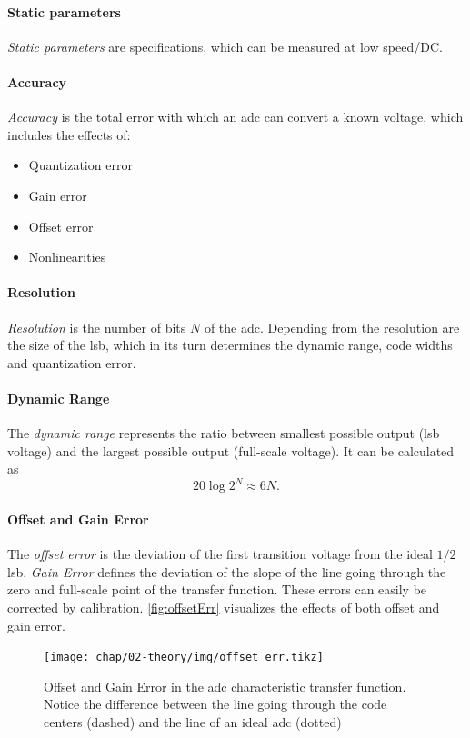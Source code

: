 \paragraph{Static parameters}
\textit{Static parameters} are specifications, which can be measured at low speed/DC. 
\paragraph{Accuracy}
\textit{Accuracy} is the total error with which an \gls{adc} can convert a known voltage, which includes the effects of:
\begin{itemize}[noitemsep]
	\item Quantization error
	\item Gain error
	\item Offset error
	\item Nonlinearities
\end{itemize}
\cite{Lundberg}
\paragraph{Resolution}
\textit{Resolution} is the number of bits $N$ of the \gls{adc}. Depending from the resolution are the size of the \gls{lsb}, which in its turn determines the dynamic range, code widths and quantization error.
\paragraph{Dynamic Range}
The \textit{dynamic range} represents the ratio between smallest possible output (\gls{lsb} voltage) and the largest possible output (full-scale voltage). It can be calculated as
\begin{equation}
	20 \log 2^{N} \approx 6N.
\end{equation}
\paragraph{Offset and Gain Error}
The \textit{offset error} is the deviation of the first transition voltage from the ideal $1/2$ \gls{lsb}. \textit{Gain Error} defines the deviation of the slope of the line going through the zero and full-scale point of the transfer function. These errors can easily be corrected by calibration. \autoref{fig:offsetErr} visualizes the effects of both offset and gain error. 
\begin{figure}[tbh]
	\centering
	\texttt{[image: chap/02-theory/img/offset\_err.tikz]}
	\caption[Effects of Offset and Fain error in ADC]{Offset and Gain Error in the \gls{adc} characteristic transfer function. Notice the difference between the line going through the code centers (dashed) and the line of an ideal \gls{adc} (dotted)}
	\label{fig:offsetErr}
\end{figure}


